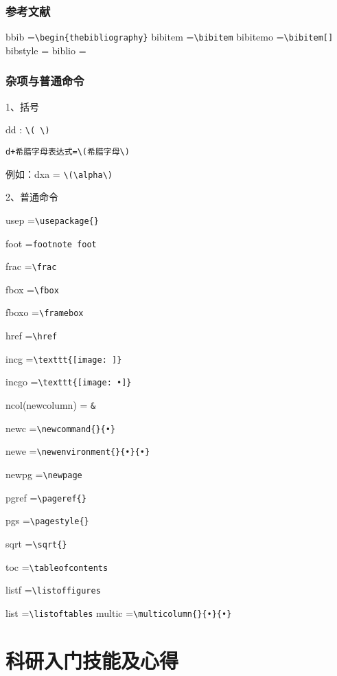  
\subsection{参考文献}
bbib      =\verb|\begin{thebibliography}|
bibitem   =\verb|\bibitem|
bibitemo  =\verb|\bibitem[]|
bibstyle   =\verb||
biblio     =\verb||
 
  
 \subsection{杂项与普通命令}
1、括号

dd : \verb|\( \)|

\verb|d+希腊字母表达式=\(希腊字母\)|

例如：dxa = \verb|\(\alpha\)|
 
2、普通命令

usep   =\verb|\usepackage{}|

foot    =\verb|footnote foot|

frac    =\verb|\frac|

fbox   =\verb|\fbox|

fboxo  =\verb|\framebox|

href   =\verb|\href|

incg   =\verb|\texttt{[image: ]}|

incgo  =\verb|\texttt{[image: •]}|

ncol(newcolumn) = \verb|&|

newc  =\verb|\newcommand{}{•}|

newe  =\verb|\newenvironment{}{•}{•}|

newpg =\verb|\newpage|

pgref  =\verb|\pageref{}|

pgs   =\verb|\pagestyle{}|

sqrt   =\verb|\sqrt{}|

toc   =\verb|\tableofcontents|

listf   =\verb|\listoffigures|

list   =\verb|\listoftables|
multic =\verb|\multicolumn{}{•}{•}|







\chapter{科研入门技能及心得}
